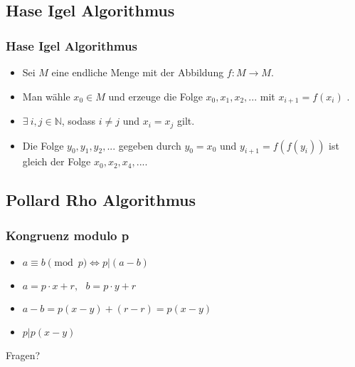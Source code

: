 \documentclass[mathserif, compress]{beamer}
\begin{document}
\subsection{Hase Igel Algorithmus}

\begin{frame}
  \frametitle{Hase Igel Algorithmus}
  \begin{itemize}
    \item<2-> Sei $M$ eine endliche Menge mit der Abbildung $f : M \rightarrow M$.
      \vspace{3mm}
    \item<3-> Man w\"ahle $x_0 \in M$ und erzeuge die Folge $x_0, x_1, x_2,...$ mit $x_{i+1} = f(x_i)$ .
      \vspace{3mm}
    \item<4-> $\exists \ i,j \in \mathbb{N}$, sodass $i \not= j$ und $x_i = x_j$ gilt.
      \vspace{3mm}
    \item<5-> Die Folge $y_0, y_1, y_2,...$ gegeben durch $y_0=x_0$ und $y_{i+1}=f(f(y_i))$ ist gleich der Folge $x_0,x_2,x_4,...$.
  \end{itemize}
\end{frame}


\subsection{Pollard Rho Algorithmus}

\begin{frame}
  \frametitle{Kongruenz modulo p}
  \begin{itemize}
	\item<1->$a \equiv b \pmod p \Leftrightarrow p|(a-b)$
\vspace{3mm}
	\item<2->$a=p\cdot x +r,\ \ \ b= p\cdot y +r$
\vspace{3mm}
	\item<3->$a-b=p(x-y)+(r-r)=p(x-y)$
\vspace{3mm}
	\item<4->$p|p(x-y)$
  \end{itemize}
\end{frame}

\begin{frame}
\centering Fragen?
\end{frame}
\end{document}

